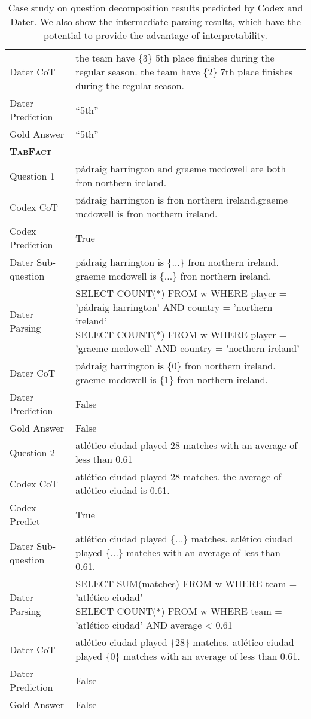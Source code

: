 \begin{table*}[h]
{\begin{tabular}{ll}
    Dater CoT  &  the team have \{3\} 5th place finishes during the regular season. the team have \{2\} 7th place finishes during the regular season. \\
    Dater Prediction  &   ``5th'' \sqlcorrect{} \\
    Gold  Answer  &   ``5th''\\
    \midrule
    \rowcolor[RGB]{240,248,255} \textsc{\textbf{TabFact}}  &  \\
    \midrule
    Question 1   & pádraig harrington and graeme mcdowell are both fron northern ireland.   \\
    Codex CoT  &  pádraig harrington is fron northern ireland.graeme mcdowell is fron northern ireland. \\
    Codex Prediction &  True \sqlwrong{} \\
    Dater Sub-question  &  pádraig harrington is \{...\} fron northern ireland. graeme mcdowell is \{...\} fron northern ireland. \\
    Dater Parsing & \makecell[l]{
    SELECT COUNT(*) FROM w WHERE player = 'pádraig harrington' AND country = 'northern ireland'\\
    SELECT COUNT(*) FROM w WHERE player = 'graeme mcdowell' AND country = 'northern ireland'}\\
    Dater CoT  &  pádraig harrington is \{0\} fron northern ireland. graeme mcdowell is \{1\} fron northern ireland. \\
    Dater Prediction &  False \sqlcorrect{} \\

    Gold Answer   &  False \\
    \midrule
    Question 2 & atlético ciudad played 28 matches with an average of less than 0.61 
    \\

    Codex CoT  & atlético ciudad played 28 matches. the average of atlético ciudad is 0.61.  \\
    Codex Predict   &   True \sqlwrong{}    \\
    Dater Sub-question  &   atlético ciudad played \{...\} matches. atlético ciudad played \{...\} matches with an average of less than 0.61.\\
    Dater Parsing &  \makecell[l]{SELECT SUM(matches) FROM w WHERE team = 'atlético ciudad'\\SELECT COUNT(*) FROM w WHERE team = 'atlético ciudad' AND average < 0.61 }     \\
    Dater CoT  &   atlético ciudad played \{28\} matches. atlético ciudad played \{0\} matches with an average of less than 0.61.\\
    Dater Prediction & False  \sqlcorrect{} \\
    Gold Answer   & False \\
    \bottomrule
  \end{tabular}}
  \caption{
  Case study on question decomposition results predicted by Codex and Dater. We also show the intermediate parsing results, which have the potential to provide the advantage of interpretability.
  }
  \label{tab:cs_cot}
\end{table*}

